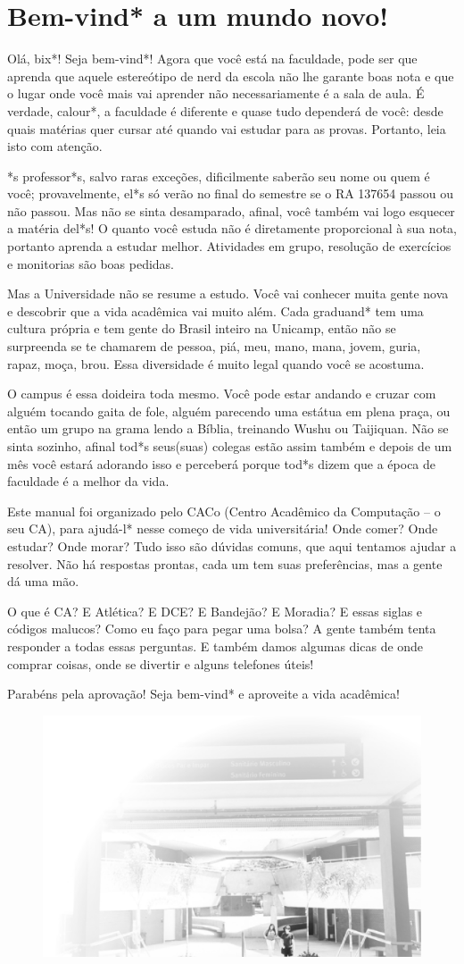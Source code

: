 
\section{Bem-vind* a um mundo novo!}

Olá, bix*! Seja bem-vind*! Agora que você está na faculdade, pode ser que
aprenda que aquele estereótipo de nerd da escola não lhe garante boas nota e
que o lugar onde você mais vai aprender não necessariamente é a sala de aula. É
verdade, calour*, a faculdade é diferente e quase tudo dependerá de você: desde
quais matérias quer cursar até quando vai estudar para as provas. Portanto, leia
isto com atenção.

*s professor*s, salvo raras exceções, dificilmente saberão seu nome ou quem é
você; provavelmente, el*s só verão no final do semestre se o RA 137654  passou
ou não passou. Mas não se sinta desamparado, afinal, você também vai logo
esquecer a matéria del*s! O quanto você estuda não é diretamente proporcional à
sua nota, portanto aprenda a estudar melhor. Atividades em grupo, resolução de
exercícios e monitorias são boas pedidas.

Mas a Universidade não se resume a estudo. Você vai conhecer muita gente nova e
descobrir que a vida acadêmica vai muito além.  Cada graduand* tem uma cultura
própria e tem gente do Brasil inteiro na Unicamp, então não se surpreenda se te
chamarem de pessoa, piá, meu, mano, mana, jovem, guria, rapaz, moça, brou.
Essa diversidade é muito legal quando você se acostuma.

O campus é essa doideira toda mesmo. Você pode estar andando e cruzar com alguém
tocando gaita de fole, alguém parecendo uma estátua em plena praça, ou então um
grupo na grama lendo a Bíblia, treinando Wushu ou Taijiquan. Não se sinta
sozinho, afinal tod*s seus(suas) colegas estão assim também e depois de um mês você
estará adorando isso e perceberá porque tod*s dizem que a época de faculdade é a
melhor da vida.

Este manual foi organizado pelo CACo (Centro Acadêmico da Computação -- o seu
CA), para ajudá-l* nesse começo de vida universitária! Onde comer? Onde estudar?
Onde morar? Tudo isso são dúvidas comuns, que aqui tentamos ajudar a resolver.
Não há respostas prontas, cada um tem suas preferências, mas a gente dá uma mão.

O que é CA? E Atlética? E DCE? E Bandejão? E Moradia? E essas siglas e códigos
malucos? Como eu faço para pegar uma bolsa? A gente também tenta responder a todas
essas perguntas. E também damos algumas dicas de onde comprar coisas, onde se
divertir e alguns telefones úteis!

Parabéns pela aprovação! Seja bem-vind* e aproveite a vida acadêmica!
 
\begin{figure}[t]
    \includegraphics[width=.45\textwidth]{img/ola_mundo/cb.jpg}
\end{figure}
